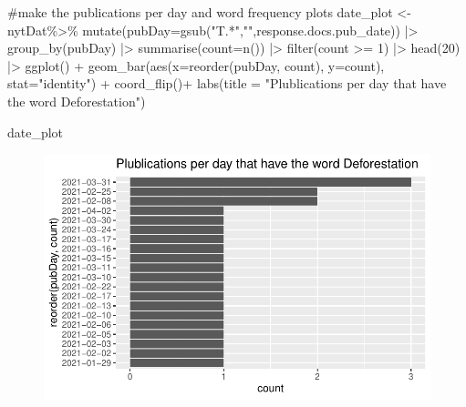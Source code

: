 \documentclass[
  letterpaper,
  DIV=11,
  numbers=noendperiod]{scrartcl}
\newenvironment{Shaded}{\begin{snugshade}}{\end{snugshade}}
\newcommand{\AttributeTok}[1]{\textcolor[rgb]{0.40,0.45,0.13}{#1}}
\newcommand{\CommentTok}[1]{\textcolor[rgb]{0.37,0.37,0.37}{#1}}
\newcommand{\DecValTok}[1]{\textcolor[rgb]{0.68,0.00,0.00}{#1}}
\newcommand{\FunctionTok}[1]{\textcolor[rgb]{0.28,0.35,0.67}{#1}}
\newcommand{\NormalTok}[1]{\textcolor[rgb]{0.00,0.23,0.31}{#1}}
\newcommand{\OtherTok}[1]{\textcolor[rgb]{0.00,0.23,0.31}{#1}}
\newcommand{\SpecialCharTok}[1]{\textcolor[rgb]{0.37,0.37,0.37}{#1}}
\newcommand{\StringTok}[1]{\textcolor[rgb]{0.13,0.47,0.30}{#1}}
\begin{document}
\begin{Shaded}
\begin{Highlighting}[]
\CommentTok{\#make the publications per day and word frequency plots}
\NormalTok{date\_plot }\OtherTok{\textless{}{-}}\NormalTok{ nytDat}\SpecialCharTok{\%\textgreater{}\%}
  \FunctionTok{mutate}\NormalTok{(}\AttributeTok{pubDay=}\FunctionTok{gsub}\NormalTok{(}\StringTok{"T.*"}\NormalTok{,}\StringTok{""}\NormalTok{,response.docs.pub\_date)) }\SpecialCharTok{|\textgreater{}}
  \FunctionTok{group\_by}\NormalTok{(pubDay) }\SpecialCharTok{|\textgreater{}}
  \FunctionTok{summarise}\NormalTok{(}\AttributeTok{count=}\FunctionTok{n}\NormalTok{()) }\SpecialCharTok{|\textgreater{}}
  \FunctionTok{filter}\NormalTok{(count }\SpecialCharTok{\textgreater{}=} \DecValTok{1}\NormalTok{) }\SpecialCharTok{|\textgreater{}}
  \FunctionTok{head}\NormalTok{(}\DecValTok{20}\NormalTok{) }\SpecialCharTok{|\textgreater{}}
  \FunctionTok{ggplot}\NormalTok{() }\SpecialCharTok{+}
  \FunctionTok{geom\_bar}\NormalTok{(}\FunctionTok{aes}\NormalTok{(}\AttributeTok{x=}\FunctionTok{reorder}\NormalTok{(pubDay, count), }\AttributeTok{y=}\NormalTok{count), }\AttributeTok{stat=}\StringTok{"identity"}\NormalTok{) }\SpecialCharTok{+}
  \FunctionTok{coord\_flip}\NormalTok{()}\SpecialCharTok{+}
  \FunctionTok{labs}\NormalTok{(}\AttributeTok{title =} \StringTok{"Plublications per day that have the word Deforestation"}\NormalTok{)}
  
\NormalTok{date\_plot}
\end{Highlighting}
\end{Shaded}

\begin{figure}[H]

{\centering \includegraphics{lab1_Ayala_files/figure-pdf/unnamed-chunk-10-1.pdf}

}

\end{figure}
\end{document}
